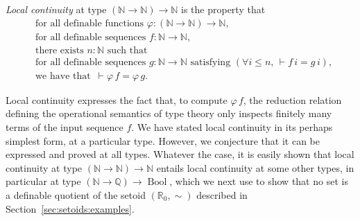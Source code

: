\documentclass[envcountsame]{llncs}
\newcommand{\N}{\mathbb{N}}
\newcommand{\Q}{\mathbb{Q}}
\newcommand{\R}{\mathbb{R}}
\DeclareMathOperator{\Bool}{Bool}
\newcommand{\fad}{\text{for all definable }}
\begin{document}
\begin{definition}\label{def:localcontinuity}
\emph{Local continuity} at type $(\N \to \N) \to \N$ is the property that
\begin{align*}
   &\fad\text{functions }\varphi : (\N \to \N) \to \N,\\
   &\fad\text{sequences }f : \N \to \N,\\
   &\text{there exists }  n:\N\text{ such that }\\
   &\fad\text{sequences } g : \N \to \N \text{ satisfying } (\forall i\leq n,\, \vdash f\,i = g\,i),\\
   &\text{we have that }{\,\vdash \varphi\, f} = \varphi\, g.
\end{align*}
\end{definition}
Local continuity expresses the fact that, to compute $\varphi\,f$, the reduction relation defining the operational semantics of type theory only inspects finitely many terms of the input sequence $f$. We have stated local continuity in its perhaps simplest form, at a particular type. However, we conjecture that it can be expressed and proved at all types. Whatever the case, it is easily shown that local continuity at type $(\N\to\N)\to\N$  entails local continuity at some other types, in particular at type $(\N\to\Q)\to\Bool$, which we next use to show that no set is a definable quotient of the setoid $(\R_0,\sim)$ described in Section~\ref{sec:setoids:examples}.
\end{document}
